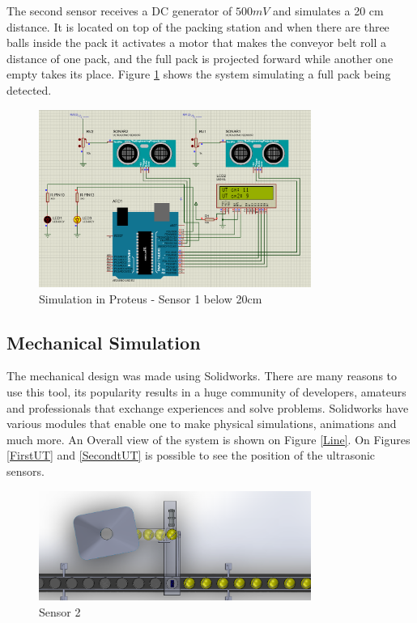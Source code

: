 \documentclass[transmag]{IEEEtran}
\begin{document}
The second sensor receives a DC generator of $500 mV$ and simulates a 20 cm distance. It is located on top of the packing station and when there are three balls inside the pack it activates a motor that makes the conveyor belt roll a distance of one pack, and the full pack is projected forward while another one empty takes its place. Figure \ref{Proteus2} shows the system simulating a full pack being detected.

\begin{figure}[h]
\centerline{\includegraphics[width=3.5in]{./images/Proteus2}}
\caption{Simulation in Proteus - Sensor 1 below 20cm\label{Proteus2}}
\end{figure}


\subsection{Mechanical Simulation}

The mechanical design was made using Solidworks. There are many reasons to use this tool, its popularity results in a huge community of developers, amateurs and professionals that exchange experiences and solve problems. Solidworks have various modules that enable one to make physical simulations, animations and much more. An Overall view of the system is shown on Figure \ref{Line}.
On Figures \ref{FirstUT} and \ref{SecondtUT} is possible to see the position of the ultrasonic sensors.

\begin{figure}[h]
\centerline{\includegraphics[width=3.5in]{./images/SecondUT}}
\caption{Sensor 2\label{SecondUT}}
\end{figure}
\end{document}
